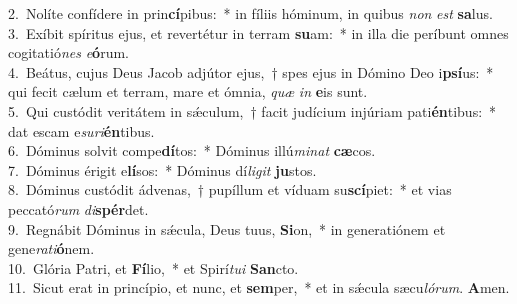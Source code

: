 {2.~}Nolíte confídere in prin\textbf{cí}pibus:~* in fíliis hóminum, in quibus \textit{non} \textit{est} \textbf{sa}lus.\\
{3.~}Exíbit spíritus ejus, et revertétur in terram \textbf{su}am:~* in illa die períbunt omnes cogitatió\textit{nes} \textit{e}\textbf{ó}rum.\\
{4.~}Beátus, cujus Deus Jacob adjútor ejus,~† spes ejus in Dómino Deo i\textbf{psí}us:~* qui fecit cælum et terram, mare et ómnia, \textit{quæ} \textit{in} \textbf{e}is sunt.\\
{5.~}Qui custódit veritátem in sǽculum,~† facit judícium injúriam pati\textbf{én}tibus:~* dat escam e\textit{su}\textit{ri}\textbf{én}tibus.\\
{6.~}Dóminus solvit compe\textbf{dí}tos:~* Dóminus illú\textit{mi}\textit{nat} \textbf{cæ}cos.\\
{7.~}Dóminus érigit e\textbf{lí}sos:~* Dóminus dí\textit{li}\textit{git} \textbf{ju}stos.\\
{8.~}Dóminus custódit ádvenas,~† pupíllum et víduam su\textbf{scí}piet:~* et vias peccató\textit{rum} \textit{di}\textbf{spér}det.\\
{9.~}Regnábit Dóminus in sǽcula, Deus tuus, \textbf{Si}on,~* in generatiónem et gene\textit{ra}\textit{ti}\textbf{ó}nem.\\
{10.~}Glória Patri, et \textbf{Fí}lio,~* et Spirí\textit{tu}\textit{i} \textbf{San}cto.\\
{11.~}Sicut erat in princípio, et nunc, et \textbf{sem}per,~* et in sǽcula sæcu\textit{ló}\textit{rum}. \textbf{A}men.\\
